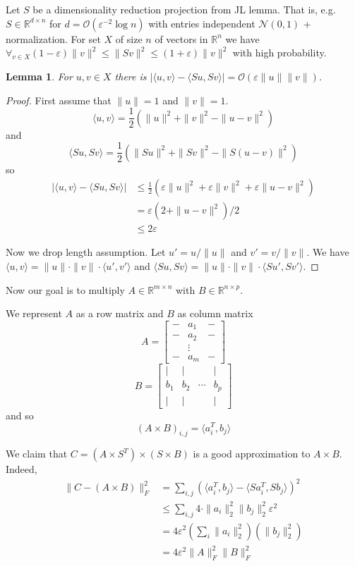 \documentclass[11pt]{article}
\newtheorem{lemma}[theorem]{Lemma}
\newcommand{\bigo}{\mathcal{O}}
\begin{document}
Let $S$ be a dimensionality reduction projection from JL lemma. That is, e.g. $S \in \mathbb{R}^{d \times n}$ for $d = \bigo(\varepsilon^{-2} \log n)$ with entries independent $\mathcal{N}(0,1)$ + normalization.
For set $X$ of size $n$ of vectors in $\mathbb{R}^n$ we have $\forall_{v \in X} (1-\varepsilon)\|v\|^2 \le \|S v\|^2 \le (1+\varepsilon) \|v\|^2$ with high probability.

\begin{lemma}
For $u,v \in X$ there is $|\langle u,v\rangle - \langle Su, Sv \rangle| = \bigo(\varepsilon \|u\| \|v\|)$.
\end{lemma}
\begin{proof}
First assume that $\|u\|=1$ and $\|v\|=1$.
$$\langle u,v\rangle = \frac{1}{2}(\|u\|^2 + \|v\|^2 - \|u-v\|^2)$$
and
$$\langle Su,Sv\rangle = \frac{1}{2}(\|Su\|^2 + \|Sv\|^2 - \|S(u-v)\|^2)$$
so
\begin{align*}|\langle u,v\rangle - \langle Su, Sv \rangle| &\le \frac{1}{2}(\varepsilon \|u\|^2 + \varepsilon \|v\|^2 +  \varepsilon \|u-v\|^2)\\
&= \varepsilon(2+ \|u-v\|^2)/2\\
&\le 2\varepsilon
\end{align*}

Now we drop length assumption. Let $u' = u/\|u\|$ and $v' = v/\|v\|$. We have $\langle u,v \rangle = \|u\| \cdot \|v\| \cdot \langle u',v' \rangle$ and $\langle Su,Sv \rangle = \|u\| \cdot \|v\| \cdot \langle Su',Sv' \rangle$.

\end{proof}

Now our goal is to multiply $A \in \mathbb{R}^{m \times n}$ with $B \in \mathbb{R}^{n \times p}$.

We represent $A$ as a row matrix and $B$ as column matrix 
$$A = \begin{bmatrix} - & a_1 & -\\ - & a_2 & -\\ & \vdots & \\ - & a_m & - \end{bmatrix}$$
$$B = \begin{bmatrix} | & | & & | \\ b_1& b_2& \cdots& b_p\\ | & | & & |  \end{bmatrix}$$
and so
$$(A \times B)_{i,j} = \langle a_i^T, b_j \rangle$$

We claim that $C =(A \times S^T) \times (S \times B)$ is a good approximation to $A \times B$.
Indeed,
\begin{align*}
\|C - (A \times B)\|_F^2 &= \sum_{i,j} \left(\langle a_i^T,b_j\rangle - \langle Sa_i^T, Sb_j \rangle\right)^2\\
&\le  \sum_{i,j} 4 \cdot \|a_i\|_2^2 \|b_j\|_2^2 \varepsilon^2\\
&= 4\varepsilon^2 \left( \sum_i \|a_i\|_2^2 \right) \left( \|b_j\|_2^2 \right)\\
&= 4 \varepsilon^2 \|A\|_F^2 \|B\|_F^2
\end{align*}
\end{document}
